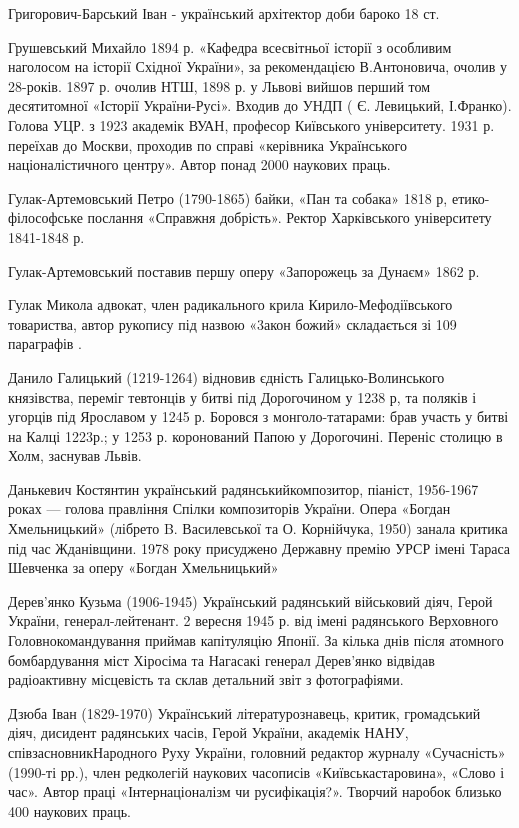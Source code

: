 Григорович-Барський Іван - український архітектор доби бароко 18 ст.

Грушевський Михайло 1894 р. «Кафедра всесвітньої історії з особливим наголосом на історії Східної України», за рекомендацією В.Антоновича, очолив у 28-років. 1897 р. очолив НТШ, 1898 р. у Львові вийшов перший том десятитомної «Історії України-Русі». Входив до УНДП ( Є. Левицький, І.Франко). Голова УЦР. з 1923 академік ВУАН, професор Київського університету. 1931 р. переїхав до Москви, проходив по справі «керівника Українського націоналістичного центру». Автор понад 2000 наукових праць. 

Гулак-Артемовський Петро (1790-1865) байки, «Пан та собака» 1818 р, етико-філософське послання «Справжня добрість». Ректор Харківського університету 1841-1848 р.

Гулак-Артемовський поставив першу оперу «Запорожець за Дунаєм»  1862 р.

Гулак Микола адвокат, член радикального крила Кирило-Мефодіївського товариства, автор рукопису під назвою «3акон божий» складається зі 109 параграфів .

Данило Галицький (1219-1264) відновив єдність Галицько-Волинського князівства, переміг тевтонців у битві під Дорогочином у 1238 р, та поляків і угорців під Ярославом у 1245 р. Боровся з монголо-татарами: брав участь у битві на Калці 1223р.; у 1253 р. коронований Папою у Дорогочині. Переніс столицю в Холм, заснував Львів.

Данькевич Костянтин український радянськийкомпозитор, піаніст, 1956-1967 роках --- голова правління Спілки композиторів України. Опера «Богдан Хмельницький» (лібрето B. Василевської та О. Корнійчука, 1950) занала критика під час Жданівщини. 1978 року присуджено Державну премію УРСР імені Тараса Шевченка за оперу «Богдан Хмельницький»  

Дерев’янко Кузьма  (1906-1945) Український радянський військовий діяч, Герой України, генерал-лейтенант. 2 вересня 1945 р. від імені радянського Верховного Головнокомандування приймав капітуляцію Японії. За кілька днів після атомного бомбардування міст Хіросіма та Нагасакі генерал Дерев’янко відвідав радіоактивну місцевість та склав детальний звіт з фотографіями.

Дзюба Іван (1829-1970) Український літературознавець, критик, громадський діяч, дисидент радянських часів, Герой України, академік НАНУ, співзасновникНародного Руху України, головний редактор журналу «Сучасність» (1990-ті рр.), член редколегій наукових часописів «Київськастаровина», «Слово і час». Автор праці «Інтернаціоналізм чи русифікація?». Творчий наробок близько 400 наукових праць.

